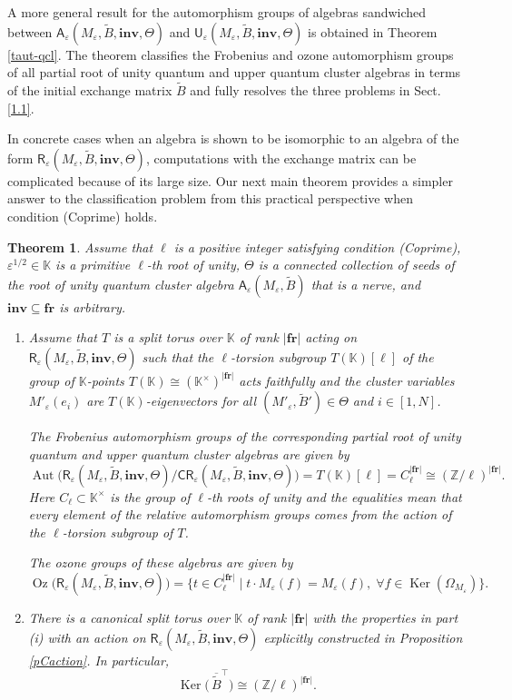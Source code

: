 \documentclass[11pt]{amsart}
\theoremstyle{plain}
\newcommand \thref[1]{Theorem \ref{t#1}}
\newcommand \prref[1]{Proposition \ref{p#1}}
\newtheorem{thmintro}{Theorem}
\def \KK {{\mathbb C}}
\def \KK {{\mathbb K}}
\def \Zset {{\mathbb Z}}
\def \A {{\boldsymbol{\mathsf A}}}
\def \C {{\boldsymbol{\mathsf C}}}
\def \R {{\boldsymbol{\mathsf R}}}
\def \U {{\boldsymbol{\mathsf U}}}
\def \B  {{\widetilde{B}}}
\newcommand \fr {{\mathbf{fr}}}
\newcommand \inv {{\mathbf{inv}}}
\def \Om {\Omega}
\def \ep {\varepsilon}
\def \ol {\overline}
\DeclareMathOperator \Aut { {\mathrm{Aut}} }
\DeclareMathOperator \Oz { {\mathrm{Oz}}}
\DeclareMathOperator \Ker { {\mathrm{Ker}} }
\begin{document}
A more general result for the automorphism groups of algebras sandwiched between  $\A_\ep(M_\ep, \B, \inv, \Theta)$
and $ \U_\ep(M_\ep, \B, \inv, \Theta)$ is obtained in 
\thref{aut-qcl}. The theorem classifies the Frobenius and ozone automorphism groups of all 
partial root of unity quantum and upper quantum cluster algebras in terms of the initial exchange matrix $\B$ and fully resolves the three problems in Sect. \ref{1.1}.

In concrete cases when an algebra is shown to be isomorphic to an algebra of the form $\R_\ep(M_\ep, \B, \inv, \Theta)$, computations with the exchange matrix can be complicated because of its large size. Our next main theorem provides a simpler answer to the classification problem from this practical perspective when condition (Coprime) holds.

\begin{thmintro} 
\label{thmB}
Assume that $\ell$ is a positive integer satisfying condition (Coprime), $\ep^{1/2} \in \KK$ is a primitive $\ell$-th root of unity, $\Theta$ is a connected collection of seeds of the root of unity quantum cluster algebra $\A_\ep(M_\ep, \B)$ that is a nerve, and $\inv \subseteq \fr$ is arbitrary. 
\begin{enumerate}
\item[(i)] Assume that $T$ is a split torus over $\KK$ of rank 
$|\fr|$ acting on $\R_\ep(M_\ep, \B, \inv, \Theta)$
such that the $\ell$-torsion subgroup $T(\KK)[\ell]$ of the group 
of $\KK$-points $T(\KK) \cong (\KK^\times)^{|\fr|}$ acts faithfully and the cluster variables $M'_\ep(e_i)$ are 
$T(\KK)$-eigenvectors for all $(M'_\ep, \B') \in \Theta$ and $i \in [1,N]$.

The Frobenius automorphism groups of the corresponding partial root of unity quantum and upper quantum cluster algebras are given by  
\[
\Aut \big(
\R_\ep(M_\ep, \B, \inv, \Theta)/
\C\R_\ep(M_\ep, \B, \inv, \Theta) \big) = 
T(\KK)[\ell] = C_\ell^{|\fr|} \cong (\Zset/\ell)^{|\fr|}.
\]
Here $C_\ell \subset \KK^\times$ is the group of $\ell$-th roots of unity and 
the equalities mean that every element of the relative automorphism 
groups comes from the action of the $\ell$-torsion subgroup of $T$.

The ozone groups of these algebras are given by 
\[
\Oz \big( \R_\ep(M_\ep, \B, \inv, \Theta) \big) =
\{ t \in C_\ell^{|\fr|} \mid t \cdot M_\ep(f) = M_\ep(f), \; \forall 
f \in \Ker (\Om_{M_\ep})\}.
\]
\item[(ii)] There is a canonical split torus over $\KK$ of rank $|\fr|$ with the properties in part (i) with an action on $\R_\ep(M_\ep, \B, \inv, \Theta)$ 
explicitly constructed in \prref{Caction}. In particular, 
\[
\Ker \big( \, \ol{\B}^\top \big) \cong (\Zset/ \ell)^{|\fr|}.
\]
\end{enumerate}
\end{thmintro}
\end{document}
